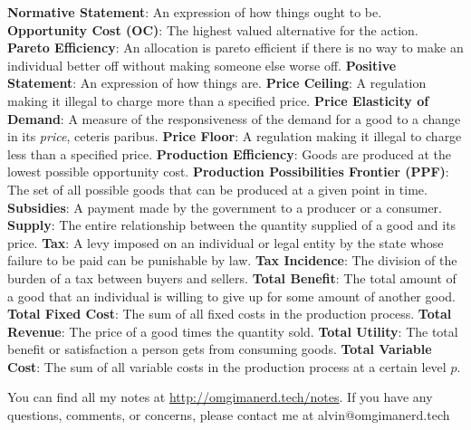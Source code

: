 \documentclass[letterpaper, 12pt]{article}
\begin{document}
\newline
\textbf{Normative Statement}: An expression of how things ought to be.
\newline
\textbf{Opportunity Cost (OC)}: The highest valued alternative for the action.
\newline
\textbf{Pareto Efficiency}: An allocation is pareto efficient if there is no
way to make an individual better off without making someone else worse off.
\newline
\textbf{Positive Statement}: An expression of how things are.
\newline
\textbf{Price Ceiling}: A regulation making it illegal to charge more than
a specified price.
\newline
\textbf{Price Elasticity of Demand}: A measure of the responsiveness of the
demand for a good to a change in its \textit{price}, ceteris paribus.
\newline
\textbf{Price Floor}: A regulation making it illegal to charge less than
a specified price.
\newline
\textbf{Production Efficiency}: Goods are produced at the lowest possible
opportunity cost.
\newline
\textbf{Production Possibilities Frontier (PPF)}: The set of all possible goods
that can be produced at a given point in time.
\newline
\textbf{Subsidies}: A payment made by the government to a producer or a
consumer.
\newline
\textbf{Supply}: The entire relationship between the quantity supplied of a
good and its price.
\newline
\textbf{Tax}: A levy imposed on an individual or legal entity by the state
whose failure to be paid can be punishable by law.
\newline
\textbf{Tax Incidence}: The division of the burden of a tax between buyers and
sellers.
\newline
\textbf{Total Benefit}: The total amount of a good that an individual is
willing to give up for some amount of another good.
\newline
\textbf{Total Fixed Cost}: The sum of all fixed costs in the production
process.
\newline
\textbf{Total Revenue}: The price of a good times the quantity sold.
\newline
\textbf{Total Utility}: The total benefit or satisfaction a person gets from
consuming goods.
\newline
\textbf{Total Variable Cost}: The sum of all variable costs in the production
process at a certain level \( p \).

\begin{center}
  You can find all my notes at \url{http://omgimanerd.tech/notes}. If you have
  any questions, comments, or concerns, please contact me at
  alvin@omgimanerd.tech
\end{center}
\end{document}
